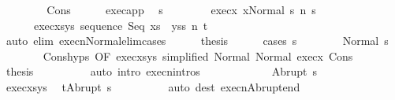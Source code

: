 \begin{isabellebody}
\ \ \isamarkupfalse%
\isanewline
\ \ \ \ \isamarkupfalse%
\ Cons\isanewline
\ \ \ \ \isamarkupfalse%
\ exec{\isacharunderscore}app\ \isamarkupfalse%
\ s{\isacharprime}\ \ \isanewline
\ \ \ \ \ \ exec{\isacharunderscore}x{\isacharcolon}\ {\isachardoublequoteopen}{\isasymGamma}{\isasymturnstile}{\isasymlangle}x{\isacharcomma}Normal\ s{\isasymrangle}\ {\isacharequal}n{\isasymRightarrow}\ s{\isacharprime}{\isachardoublequoteclose}\ \isanewline
\ \ \ \ \ \ exec{\isacharunderscore}xs{\isacharunderscore}ys{\isacharcolon}\ {\isachardoublequoteopen}{\isasymGamma}{\isasymturnstile}{\isasymlangle}sequence\ Seq\ {\isacharparenleft}xs\ {\isacharat}\ ys{\isacharparenright}{\isacharcomma}s{\isacharprime}{\isasymrangle}\ {\isacharequal}n{\isasymRightarrow}\ t{\isachardoublequoteclose}\isanewline
\ \ \ \ \ \ \isamarkupfalse%
\ {\isacharparenleft}auto\ elim{\isacharcolon}\ execn{\isacharunderscore}Normal{\isacharunderscore}elim{\isacharunderscore}cases{\isacharparenright}\isanewline
\ \ \ \ \isamarkupfalse%
\ {\isacharquery}thesis\isanewline
\ \ \ \ \isamarkupfalse%
\ {\isacharparenleft}cases\ s{\isacharprime}{\isacharparenright}\isanewline
\ \ \ \ \ \ \isamarkupfalse%
\ {\isacharparenleft}Normal\ s{\isacharprime}{\isacharprime}{\isacharparenright}\isanewline
\ \ \ \ \ \ \isamarkupfalse%
\ Cons{\isachardot}hyps\ {\isacharbrackleft}OF\ exec{\isacharunderscore}xs{\isacharunderscore}ys\ {\isacharbrackleft}simplified\ Normal{\isacharbrackright}{\isacharbrackright}\ Normal\ exec{\isacharunderscore}x\ Cons\isanewline
\ \ \ \ \ \ \isamarkupfalse%
\ {\isacharquery}thesis\isanewline
\ \ \ \ \ \ \ \ \isamarkupfalse%
\ {\isacharparenleft}auto\ intro{\isacharcolon}\ execn{\isachardot}intros{\isacharparenright}\isanewline
\ \ \ \ \isamarkupfalse%
\isanewline
\ \ \ \ \ \ \isamarkupfalse%
\ {\isacharparenleft}Abrupt\ s{\isacharprime}{\isacharprime}{\isacharparenright}\isanewline
\ \ \ \ \ \ \isamarkupfalse%
\ exec{\isacharunderscore}xs{\isacharunderscore}ys\ \isamarkupfalse%
\ {\isachardoublequoteopen}t{\isacharequal}Abrupt\ s{\isacharprime}{\isacharprime}{\isachardoublequoteclose}\isanewline
\ \ \ \ \ \ \ \ \isamarkupfalse%
\ {\isacharparenleft}auto\ dest{\isacharcolon}\ execn{\isacharunderscore}Abrupt{\isacharunderscore}end{\isacharparenright}\isanewline
\ \ \ \ \ \ \isamarkupfalse%

\end{isabellebody}
